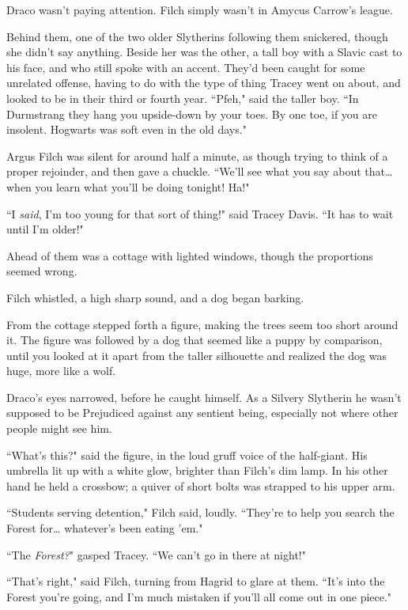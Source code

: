 Draco wasn't paying attention. Filch simply wasn't in Amycus Carrow's league.

Behind them, one of the two older Slytherins following them snickered, though she didn't say anything. Beside her was the other, a tall boy with a Slavic cast to his face, and who still spoke with an accent. They'd been caught for some unrelated offense, having to do with the type of thing Tracey went on about, and looked to be in their third or fourth year. ``Pfeh," said the taller boy. ``In Durmstrang they hang you upside-down by your toes. By one toe, if you are insolent. Hogwarts was soft even in the old days."

Argus Filch was silent for around half a minute, as though trying to think of a proper rejoinder, and then gave a chuckle. ``We'll see what you say about that{\ldots} when you learn what you'll be doing tonight! Ha!"

``I \emph{said}, I'm too young for that sort of thing!" said Tracey Davis. ``It has to wait until I'm older!"

Ahead of them was a cottage with lighted windows, though the proportions seemed wrong.

Filch whistled, a high sharp sound, and a dog began barking.

From the cottage stepped forth a figure, making the trees seem too short around it. The figure was followed by a dog that seemed like a puppy by comparison, until you looked at it apart from the taller silhouette and realized the dog was huge, more like a wolf.

Draco's eyes narrowed, before he caught himself. As a Silvery Slytherin he wasn't supposed to be Prejudiced against any sentient being, especially not where other people might see him.

``What's this?" said the figure, in the loud gruff voice of the half-giant. His umbrella lit up with a white glow, brighter than Filch's dim lamp. In his other hand he held a crossbow; a quiver of short bolts was strapped to his upper arm.

``Students serving detention," Filch said, loudly. ``They're to help you search the Forest for{\ldots} whatever's been eating 'em."

``The \emph{Forest?}" gasped Tracey. ``We can't go in there at night!"

``That's right," said Filch, turning from Hagrid to glare at them. ``It's into the Forest you're going, and I'm much mistaken if you'll all come out in one piece."

